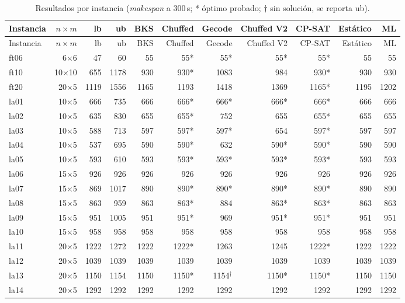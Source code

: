 {\scriptsize
\begin{longtable}{lrrrrrrrrrr}
\caption{Resultados por instancia (\textit{makespan} a 300\,s; * óptimo probado; $\dagger$ sin solución, se reporta ub).}\label{tab:anexo_instancias}\\
\toprule
Instancia & $n\times m$ & lb & ub & BKS & Chuffed & Gecode & Chuffed V2 & CP-SAT & Estático & ML \\
\midrule
\endfirsthead
\toprule
Instancia & $n\times m$ & lb & ub & BKS & Chuffed & Gecode & Chuffed V2 & CP-SAT & Estático & ML \\
\midrule
\endhead
\bottomrule
\endfoot
ft06 & 6$\times$6 & 47 & 60 & 55 & 55* & 55* & 55* & 55* & 55 & 55 \\
ft10 & 10$\times$10 & 655 & 1178 & 930 & 930* & 1083 & 984 & 930* & 930 & 930 \\
ft20 & 20$\times$5 & 1119 & 1556 & 1165 & 1193 & 1418 & 1369 & 1165* & 1195 & 1202 \\
la01 & 10$\times$5 & 666 & 735 & 666 & 666* & 666* & 666* & 666* & 666 & 666 \\
la02 & 10$\times$5 & 635 & 830 & 655 & 655* & 752 & 655 & 655* & 655 & 655 \\
la03 & 10$\times$5 & 588 & 713 & 597 & 597* & 597* & 654 & 597* & 597 & 597 \\
la04 & 10$\times$5 & 537 & 695 & 590 & 590* & 632 & 590* & 590* & 590 & 590 \\
la05 & 10$\times$5 & 593 & 610 & 593 & 593* & 593* & 593* & 593* & 593 & 593 \\
la06 & 15$\times$5 & 926 & 926 & 926 & 926 & 926 & 926 & 926 & 926 & 926 \\
la07 & 15$\times$5 & 869 & 1017 & 890 & 890* & 890* & 890* & 890* & 890 & 890 \\
la08 & 15$\times$5 & 863 & 959 & 863 & 863* & 884 & 863* & 863* & 863 & 863 \\
la09 & 15$\times$5 & 951 & 1005 & 951 & 951* & 969 & 951* & 951* & 951 & 951 \\
la10 & 15$\times$5 & 958 & 958 & 958 & 958 & 958 & 958 & 958 & 958 & 958 \\
la11 & 20$\times$5 & 1222 & 1272 & 1222 & 1222* & 1263 & 1245 & 1222* & 1222 & 1222 \\
la12 & 20$\times$5 & 1039 & 1039 & 1039 & 1039 & 1039 & 1039 & 1039 & 1039 & 1039 \\
la13 & 20$\times$5 & 1150 & 1154 & 1150 & 1150* & 1154$^\dagger$ & 1150* & 1150* & 1150 & 1150 \\
la14 & 20$\times$5 & 1292 & 1292 & 1292 & 1292 & 1292 & 1292 & 1292 & 1292 & 1292 \\

\end{longtable}}
